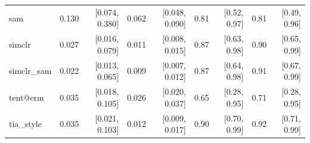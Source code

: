 \begin{tabular}{lrrrrrrrr}
sam & 0.130 & [0.074, 0.380] & 0.062 & [0.048, 0.090] & 0.81 & [0.52, 0.97] & 0.81 & [0.49, 0.96] \\
simclr & 0.027 & [0.016, 0.079] & 0.011 & [0.008, 0.015] & 0.87 & [0.63, 0.98] & 0.90 & [0.65, 0.99] \\
simclr\_sam & 0.022 & [0.013, 0.065] & 0.009 & [0.007, 0.012] & 0.87 & [0.64, 0.98] & 0.91 & [0.67, 0.99] \\
tent@erm & 0.035 & [0.018, 0.105] & 0.026 & [0.020, 0.037] & 0.65 & [0.28, 0.95] & 0.71 & [0.28, 0.95] \\
tia\_style & 0.035 & [0.021, 0.103] & 0.012 & [0.009, 0.017] & 0.90 & [0.70, 0.99] & 0.92 & [0.71, 0.99] \\
\bottomrule
\end{tabular}
